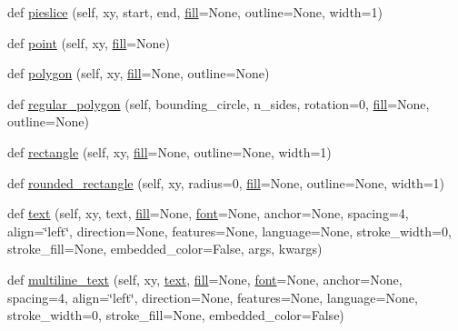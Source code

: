 \begin{DoxyCompactItemize}
\item 
def \hyperlink{classPIL_1_1ImageDraw_1_1ImageDraw_a877c53481ff0084c090e1ebdc207537b}{pieslice} (self, xy, start, end, \hyperlink{classPIL_1_1ImageDraw_1_1ImageDraw_aae14451f06798e855e851364079caa8a}{fill}=None, outline=None, width=1)
\item 
def \hyperlink{classPIL_1_1ImageDraw_1_1ImageDraw_af997149fb0ab0ae0c9c67aee64fb5976}{point} (self, xy, \hyperlink{classPIL_1_1ImageDraw_1_1ImageDraw_aae14451f06798e855e851364079caa8a}{fill}=None)
\item 
def \hyperlink{classPIL_1_1ImageDraw_1_1ImageDraw_aab1557a21439824d12c73d6653f98660}{polygon} (self, xy, \hyperlink{classPIL_1_1ImageDraw_1_1ImageDraw_aae14451f06798e855e851364079caa8a}{fill}=None, outline=None)
\item 
def \hyperlink{classPIL_1_1ImageDraw_1_1ImageDraw_a4baa513fe6dfc7cd601ce860ec1bb9e8}{regular\+\_\+polygon} (self, bounding\+\_\+circle, n\+\_\+sides, rotation=0, \hyperlink{classPIL_1_1ImageDraw_1_1ImageDraw_aae14451f06798e855e851364079caa8a}{fill}=None, outline=None)
\item 
def \hyperlink{classPIL_1_1ImageDraw_1_1ImageDraw_a4e2739b13548b74402a3a28003583ca5}{rectangle} (self, xy, \hyperlink{classPIL_1_1ImageDraw_1_1ImageDraw_aae14451f06798e855e851364079caa8a}{fill}=None, outline=None, width=1)
\item 
def \hyperlink{classPIL_1_1ImageDraw_1_1ImageDraw_a6c7b6095263195d5d60e86124e122894}{rounded\+\_\+rectangle} (self, xy, radius=0, \hyperlink{classPIL_1_1ImageDraw_1_1ImageDraw_aae14451f06798e855e851364079caa8a}{fill}=None, outline=None, width=1)
\item 
def \hyperlink{classPIL_1_1ImageDraw_1_1ImageDraw_a13be584a7af12b6ed0b118bfb15f6030}{text} (self, xy, text, \hyperlink{classPIL_1_1ImageDraw_1_1ImageDraw_aae14451f06798e855e851364079caa8a}{fill}=None, \hyperlink{classPIL_1_1ImageDraw_1_1ImageDraw_a1a0babedef110fd4d10b55fa4041024d}{font}=None, anchor=None, spacing=4, align=\char`\"{}left\char`\"{}, direction=None, features=None, language=None, stroke\+\_\+width=0, stroke\+\_\+fill=None, embedded\+\_\+color=False, args, kwargs)
\item 
def \hyperlink{classPIL_1_1ImageDraw_1_1ImageDraw_a8a9679fafb518afce548c9ef0f49cf00}{multiline\+\_\+text} (self, xy, \hyperlink{classPIL_1_1ImageDraw_1_1ImageDraw_a13be584a7af12b6ed0b118bfb15f6030}{text}, \hyperlink{classPIL_1_1ImageDraw_1_1ImageDraw_aae14451f06798e855e851364079caa8a}{fill}=None, \hyperlink{classPIL_1_1ImageDraw_1_1ImageDraw_a1a0babedef110fd4d10b55fa4041024d}{font}=None, anchor=None, spacing=4, align=\char`\"{}left\char`\"{}, direction=None, features=None, language=None, stroke\+\_\+width=0, stroke\+\_\+fill=None, embedded\+\_\+color=False)

\end{DoxyCompactItemize}
